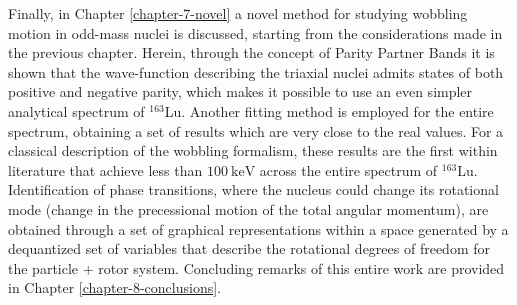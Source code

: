 Finally, in Chapter \ref{chapter-7-novel} a novel method for studying wobbling motion in odd-mass nuclei is discussed, starting from the considerations made in the previous chapter. Herein, through the concept of Parity Partner Bands it is shown that the wave-function describing the triaxial nuclei admits states of both positive and negative parity, which makes it possible to use an even simpler analytical spectrum of $^{163}$Lu. Another fitting method is employed for the entire spectrum, obtaining a set of results which are very close to the real values. For a classical description of the wobbling formalism, these results are the first within literature that achieve less than $100\ \text{keV}$ across the entire spectrum of $^{163}$Lu. Identification of phase transitions, where the nucleus could change its rotational mode (change in the precessional motion of the total angular momentum), are obtained through a set of graphical representations within a space generated by a dequantized set of variables that describe the rotational degrees of freedom for the particle + rotor system. Concluding remarks of this entire work are provided in Chapter \ref{chapter-8-conclusions}.